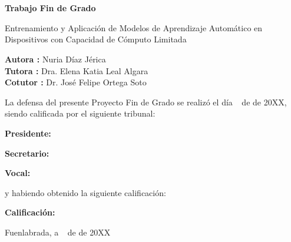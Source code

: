 \documentclass[a4paper, 12pt]{book}
\begin{document}
\newpage
\mbox{}
\thispagestyle{empty} %


\clearpage
{}
\chapter*{}

\vspace{-4cm}
\begin{center}
\LARGE
\textbf{Trabajo Fin de Grado}

\vspace{1cm}
\large
Entrenamiento y Aplicación de Modelos de Aprendizaje Automático en Dispositivos con Capacidad de Cómputo Limitada

\vspace{1cm}
\large
\textbf{Autora :} Nuria Díaz Jérica  \\
\textbf{Tutora :} Dra. Elena Katia Leal Algara  \\
\textbf{Cotutor :} Dr. José Felipe Ortega Soto

\end{center}

\vspace{1cm}
La defensa del presente Proyecto Fin de Grado se realizó el día \qquad$\;\,$ de
\qquad\qquad\qquad\qquad \newline de 20XX, siendo calificada por el siguiente tribunal:


\vspace{0.5cm}
\textbf{Presidente:}

\vspace{0.8cm}
\textbf{Secretario:}

\vspace{0.8cm}
\textbf{Vocal:}


\vspace{0.8cm}
y habiendo obtenido la siguiente calificación:

\vspace{0.8cm}
\textbf{Calificación:}


\vspace{0.8cm}
\begin{flushright}
Fuenlabrada, a \qquad$\;\,$ de \qquad\qquad\qquad\qquad de 20XX
\end{flushright}

\end{document}
